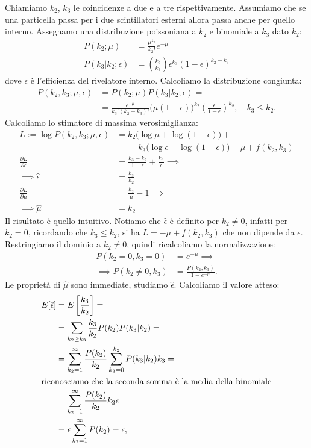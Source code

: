 \documentclass[a4paper]{article}
\newcommand*\pdv[2]{\frac{\partial #1}{\partial #2}}
\begin{document}
Chiamiamo $k_2$, $k_3$ le coincidenze a due e a tre rispettivamente.
Assumiamo che se una particella passa per i due scintillatori esterni allora passa anche per quello interno.
Assegnamo una distribuzione poissoniana a $k_2$ e binomiale a $k_3$ dato $k_2$:
\begin{align*}
	P(k_2;\mu)
	&= \frac{\mu^{k_2}}{k_2!}e^{-\mu} \\
	P(k_3|k_2;\epsilon)
	&= \binom{k_2}{k_3} \epsilon^{k_3} (1-\epsilon)^{k_2-k_3}
\end{align*}
dove $\epsilon$ è l'efficienza del rivelatore interno.
Calcoliamo la distribuzione congiunta:
\begin{align*}
	P(k_2,k_3;\mu,\epsilon)
	&= P(k_2;\mu) P(k_3|k_2;\epsilon) = \\
	&= \frac{e^{-\mu}}{k_3!(k_2-k_3)!} \big(\mu(1-\epsilon)\big)^{k_2} \left(\frac\epsilon{1-\epsilon}\right)^{k_3},
	\quad k_3 \le k_2.
\end{align*}
Calcoliamo lo stimatore di massima verosimiglianza:
\begin{align*}
	L := \log P(k_2,k_3;\mu,\epsilon)
	&= k_2 \big( \log\mu + \log(1-\epsilon) \big) + {}\\
	&\phantom{{}={}}+ k_3 \big( \log\epsilon - \log(1-\epsilon) \big)
	- \mu + f(k_2,k_3) \\
	\pdv{L}{\epsilon}
	&= \frac{k_3-k_2}{1-\epsilon} + \frac{k_3}\epsilon \implies \\
	\implies \hat\epsilon
	&= \frac{k_3}{k_2} \\
	\pdv{L}{\mu}
	&= \frac{k_2}{\mu} - 1 \implies \\
	\implies \hat\mu
	&= k_2
\end{align*}
Il risultato è quello intuitivo.
Notiamo che $\hat\epsilon$ è definito per $k_2\neq 0$,
infatti per $k_2=0$, ricordando che $k_3\le k_2$, si ha
$L = -\mu + f(k_2,k_3)$ che non dipende da $\epsilon$.
Restringiamo il dominio a $k_2\neq 0$,
quindi ricalcoliamo la normalizzazione:
\begin{align*}
	P(k_2=0,k_3=0)
	&= e^{-\mu} \implies \\
	\implies P(k_2\neq 0,k_3)
	&= \frac{P(k_2,k_3)}{1-e^{-\mu}}.
\end{align*}
Le proprietà di $\hat\mu$ sono immediate,
studiamo $\hat\epsilon$.
Calcoliamo il valore atteso:
\begin{align*}
	E[\hat\epsilon]
	&= E \left[ \frac{k_3}{k_2} \right] = \\
	&= \sum_{k_2\ge k_3} \frac{k_3}{k_2} P(k_2) P(k_3|k_2) = \\
	&= \sum_{k_2=1}^\infty \frac{P(k_2)}{k_2}
	\sum_{k_3=0}^{k_2} P(k_3|k_2) k_3 = \\
	\intertext{riconosciamo che la seconda somma è la media della binomiale}
	&= \sum_{k_2=1}^\infty \frac{P(k_2)}{k_2} k_2 \epsilon = \\
	&= \epsilon \sum_{k_2=1}^\infty P(k_2)
	= \epsilon,
\end{align*}
\end{document}
